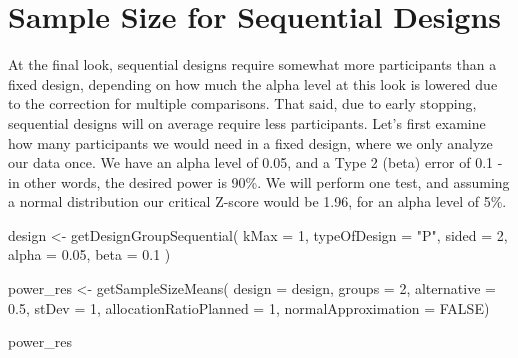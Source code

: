 \documentclass[
  oneside]{krantz}
\makeatletter
\newenvironment{Shaded}{\begin{snugshade}}{\end{snugshade}}
\newcommand{\AttributeTok}[1]{\textcolor[rgb]{0.61,0.61,0.61}{#1}}
\newcommand{\ConstantTok}[1]{\textcolor[rgb]{0,0,0}{#1}}
\newcommand{\DecValTok}[1]{\textcolor[rgb]{0.06,0.06,0.06}{#1}}
\newcommand{\FloatTok}[1]{\textcolor[rgb]{0.06,0.06,0.06}{#1}}
\newcommand{\FunctionTok}[1]{\textcolor[rgb]{0,0,0}{#1}}
\newcommand{\NormalTok}[1]{#1}
\newcommand{\OtherTok}[1]{\textcolor[rgb]{0.37,0.37,0.37}{#1}}
\newcommand{\StringTok}[1]{\textcolor[rgb]{0.5,0.5,0.5}{#1}}
\newenvironment{kframe}{%
\medskip{}
\setlength{\fboxsep}{.8em}
 \def\at@end@of@kframe{}%
 \ifinner\ifhmode%
  \def\at@end@of@kframe{\end{minipage}}%
  \begin{minipage}{\columnwidth}%
 \fi\fi%
 \def\FrameCommand##1{\hskip\@totalleftmargin \hskip-\fboxsep
 \colorbox{shadecolor}{##1}\hskip-\fboxsep
     \hskip-\linewidth \hskip-\@totalleftmargin \hskip\columnwidth}%
 \MakeFramed {\advance\hsize-\width
   \@totalleftmargin\z@ \linewidth\hsize
   \@setminipage}}%
 {\par\unskip\endMakeFramed%
 \at@end@of@kframe}
\renewenvironment{Shaded}{\begin{kframe}}{\end{kframe}}
\makeatother
\begin{document}
\hypertarget{sample-size-for-sequential-designs}{%
\section{Sample Size for Sequential Designs}\label{sample-size-for-sequential-designs}}

At the final look, sequential designs require somewhat more participants than a fixed design, depending on how much the alpha level at this look is lowered due to the correction for multiple comparisons. That said, due to early stopping, sequential designs will on average require less participants. Let's first examine how many participants we would need in a fixed design, where we only analyze our data once. We have an alpha level of 0.05, and a Type 2 (beta) error of 0.1 - in other words, the desired power is 90\%. We will perform one test, and assuming a normal distribution our critical Z-score would be 1.96, for an alpha level of 5\%.

\begin{Shaded}
\begin{Highlighting}[]
\NormalTok{design }\OtherTok{\textless{}{-}} \FunctionTok{getDesignGroupSequential}\NormalTok{(}
  \AttributeTok{kMax =} \DecValTok{1}\NormalTok{,}
  \AttributeTok{typeOfDesign =} \StringTok{"P"}\NormalTok{,}
  \AttributeTok{sided =} \DecValTok{2}\NormalTok{,}
  \AttributeTok{alpha =} \FloatTok{0.05}\NormalTok{,}
  \AttributeTok{beta =} \FloatTok{0.1}
\NormalTok{)}

\NormalTok{power\_res }\OtherTok{\textless{}{-}} \FunctionTok{getSampleSizeMeans}\NormalTok{(}
  \AttributeTok{design =}\NormalTok{ design,}
  \AttributeTok{groups =} \DecValTok{2}\NormalTok{,}
  \AttributeTok{alternative =} \FloatTok{0.5}\NormalTok{, }
  \AttributeTok{stDev =} \DecValTok{1}\NormalTok{, }
  \AttributeTok{allocationRatioPlanned =} \DecValTok{1}\NormalTok{,}
  \AttributeTok{normalApproximation =} \ConstantTok{FALSE}\NormalTok{)}

\NormalTok{power\_res}
\end{Highlighting}
\end{Shaded}
\end{document}

